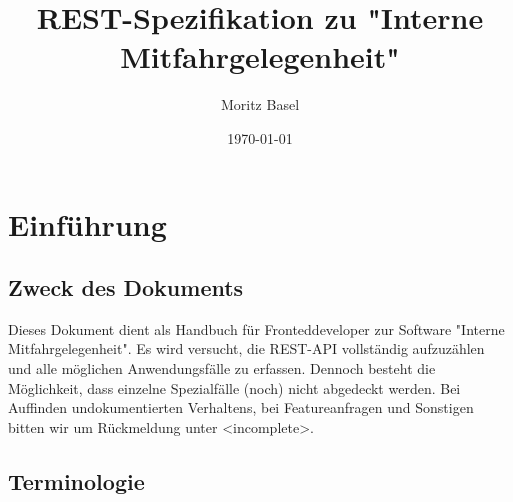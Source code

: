 \documentclass[11pt,a4paper]{article}
\author{Moritz Basel}
\title{REST-Spezifikation zu "Interne Mitfahrgelegenheit"}
\date{\today{}}
\begin{document}
\normalfont
\maketitle{}
\tableofcontents{}
\section{Einführung}
\subsection{Zweck des Dokuments}
Dieses Dokument dient als Handbuch für Fronteddeveloper zur Software "Interne Mitfahrgelegenheit". Es wird versucht, die REST-API vollständig aufzuzählen und alle möglichen Anwendungsfälle zu erfassen.
Dennoch besteht die Möglichkeit, dass einzelne Spezialfälle (noch) nicht abgedeckt werden. Bei Auffinden undokumentierten Verhaltens, bei Featureanfragen und Sonstigen bitten wir um Rückmeldung unter <incomplete>.
\subsection{Terminologie}
\end{document}
